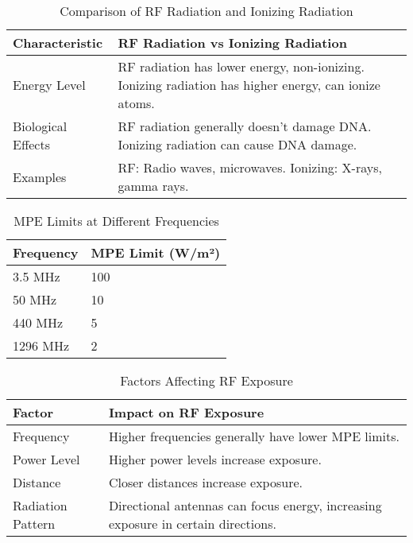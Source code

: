 \begin{table}[h]
    \centering
    \begin{tabular}{|l|l|}
        \hline
        \textbf{Characteristic} & \textbf{RF Radiation vs Ionizing Radiation} \\
        \hline
        Energy Level & RF radiation has lower energy, non-ionizing. Ionizing radiation has higher energy, can ionize atoms. \\
        \hline
        Biological Effects & RF radiation generally doesn't damage DNA. Ionizing radiation can cause DNA damage. \\
        \hline
        Examples & RF: Radio waves, microwaves. Ionizing: X-rays, gamma rays. \\
        \hline
    \end{tabular}
    \caption{Comparison of RF Radiation and Ionizing Radiation}
    \label{tab:rf-vs-ionizing}
\end{table}

\begin{table}[h]
    \centering
    \begin{tabular}{|l|l|}
        \hline
        \textbf{Frequency} & \textbf{MPE Limit (W/m²)} \\
        \hline
        3.5 MHz & 100 \\
        \hline
        50 MHz & 10 \\
        \hline
        440 MHz & 5 \\
        \hline
        1296 MHz & 2 \\
        \hline
    \end{tabular}
    \caption{MPE Limits at Different Frequencies}
    \label{tab:mpe-limits}
\end{table}

\begin{table}[h]
    \centering
    \begin{tabular}{|l|l|}
        \hline
        \textbf{Factor} & \textbf{Impact on RF Exposure} \\
        \hline
        Frequency & Higher frequencies generally have lower MPE limits. \\
        \hline
        Power Level & Higher power levels increase exposure. \\
        \hline
        Distance & Closer distances increase exposure. \\
        \hline
        Radiation Pattern & Directional antennas can focus energy, increasing exposure in certain directions. \\
        \hline
    \end{tabular}
    \caption{Factors Affecting RF Exposure}
    \label{tab:rf-exposure-factors}
\end{table}
